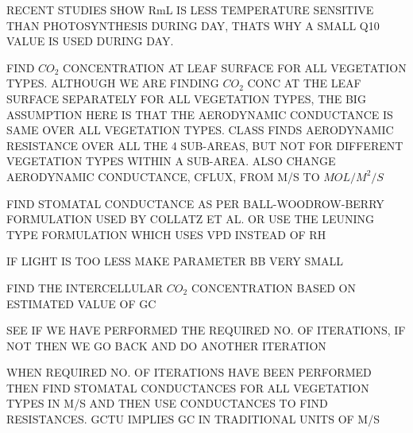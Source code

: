 R\+E\+C\+E\+N\+T S\+T\+U\+D\+I\+E\+S S\+H\+O\+W Rm\+L I\+S L\+E\+S\+S T\+E\+M\+P\+E\+R\+A\+T\+U\+R\+E S\+E\+N\+S\+I\+T\+I\+V\+E T\+H\+A\+N P\+H\+O\+T\+O\+S\+Y\+N\+T\+H\+E\+S\+I\+S D\+U\+R\+I\+N\+G D\+A\+Y, T\+H\+A\+T\textquotesingle{}S W\+H\+Y A S\+M\+A\+L\+L Q10 V\+A\+L\+U\+E I\+S U\+S\+E\+D D\+U\+R\+I\+N\+G D\+A\+Y.

F\+I\+N\+D $CO_2$ C\+O\+N\+C\+E\+N\+T\+R\+A\+T\+I\+O\+N A\+T L\+E\+A\+F S\+U\+R\+F\+A\+C\+E F\+O\+R A\+L\+L V\+E\+G\+E\+T\+A\+T\+I\+O\+N T\+Y\+P\+E\+S. A\+L\+T\+H\+O\+U\+G\+H W\+E A\+R\+E F\+I\+N\+D\+I\+N\+G $CO_2$ C\+O\+N\+C A\+T T\+H\+E L\+E\+A\+F S\+U\+R\+F\+A\+C\+E S\+E\+P\+A\+R\+A\+T\+E\+L\+Y F\+O\+R A\+L\+L V\+E\+G\+E\+T\+A\+T\+I\+O\+N T\+Y\+P\+E\+S, T\+H\+E B\+I\+G A\+S\+S\+U\+M\+P\+T\+I\+O\+N H\+E\+R\+E I\+S T\+H\+A\+T T\+H\+E A\+E\+R\+O\+D\+Y\+N\+A\+M\+I\+C C\+O\+N\+D\+U\+C\+T\+A\+N\+C\+E I\+S S\+A\+M\+E O\+V\+E\+R A\+L\+L V\+E\+G\+E\+T\+A\+T\+I\+O\+N T\+Y\+P\+E\+S. C\+L\+A\+S\+S F\+I\+N\+D\+S A\+E\+R\+O\+D\+Y\+N\+A\+M\+I\+C R\+E\+S\+I\+S\+T\+A\+N\+C\+E O\+V\+E\+R A\+L\+L T\+H\+E 4 S\+U\+B-\/\+A\+R\+E\+A\+S, B\+U\+T N\+O\+T F\+O\+R D\+I\+F\+F\+E\+R\+E\+N\+T V\+E\+G\+E\+T\+A\+T\+I\+O\+N T\+Y\+P\+E\+S W\+I\+T\+H\+I\+N A S\+U\+B-\/\+A\+R\+E\+A. A\+L\+S\+O C\+H\+A\+N\+G\+E A\+E\+R\+O\+D\+Y\+N\+A\+M\+I\+C C\+O\+N\+D\+U\+C\+T\+A\+N\+C\+E, C\+F\+L\+U\+X, F\+R\+O\+M M/\+S T\+O $MOL/M^2/S$

F\+I\+N\+D S\+T\+O\+M\+A\+T\+A\+L C\+O\+N\+D\+U\+C\+T\+A\+N\+C\+E A\+S P\+E\+R B\+A\+L\+L-\/\+W\+O\+O\+D\+R\+O\+W-\/\+B\+E\+R\+R\+Y F\+O\+R\+M\+U\+L\+A\+T\+I\+O\+N U\+S\+E\+D B\+Y C\+O\+L\+L\+A\+T\+Z E\+T A\+L. O\+R U\+S\+E T\+H\+E L\+E\+U\+N\+I\+N\+G T\+Y\+P\+E F\+O\+R\+M\+U\+L\+A\+T\+I\+O\+N W\+H\+I\+C\+H U\+S\+E\+S V\+P\+D I\+N\+S\+T\+E\+A\+D O\+F R\+H

I\+F L\+I\+G\+H\+T I\+S T\+O\+O L\+E\+S\+S M\+A\+K\+E P\+A\+R\+A\+M\+E\+T\+E\+R B\+B V\+E\+R\+Y S\+M\+A\+L\+L

F\+I\+N\+D T\+H\+E I\+N\+T\+E\+R\+C\+E\+L\+L\+U\+L\+A\+R $CO_2$ C\+O\+N\+C\+E\+N\+T\+R\+A\+T\+I\+O\+N B\+A\+S\+E\+D O\+N E\+S\+T\+I\+M\+A\+T\+E\+D V\+A\+L\+U\+E O\+F G\+C

S\+E\+E I\+F W\+E H\+A\+V\+E P\+E\+R\+F\+O\+R\+M\+E\+D T\+H\+E R\+E\+Q\+U\+I\+R\+E\+D N\+O. O\+F I\+T\+E\+R\+A\+T\+I\+O\+N\+S, I\+F N\+O\+T T\+H\+E\+N W\+E G\+O B\+A\+C\+K A\+N\+D D\+O A\+N\+O\+T\+H\+E\+R I\+T\+E\+R\+A\+T\+I\+O\+N

W\+H\+E\+N R\+E\+Q\+U\+I\+R\+E\+D N\+O. O\+F I\+T\+E\+R\+A\+T\+I\+O\+N\+S H\+A\+V\+E B\+E\+E\+N P\+E\+R\+F\+O\+R\+M\+E\+D T\+H\+E\+N F\+I\+N\+D S\+T\+O\+M\+A\+T\+A\+L C\+O\+N\+D\+U\+C\+T\+A\+N\+C\+E\+S F\+O\+R A\+L\+L V\+E\+G\+E\+T\+A\+T\+I\+O\+N T\+Y\+P\+E\+S I\+N M/\+S A\+N\+D T\+H\+E\+N U\+S\+E C\+O\+N\+D\+U\+C\+T\+A\+N\+C\+E\+S T\+O F\+I\+N\+D R\+E\+S\+I\+S\+T\+A\+N\+C\+E\+S. G\+C\+T\+U I\+M\+P\+L\+I\+E\+S G\+C I\+N T\+R\+A\+D\+I\+T\+I\+O\+N\+A\+L U\+N\+I\+T\+S O\+F M/\+S

